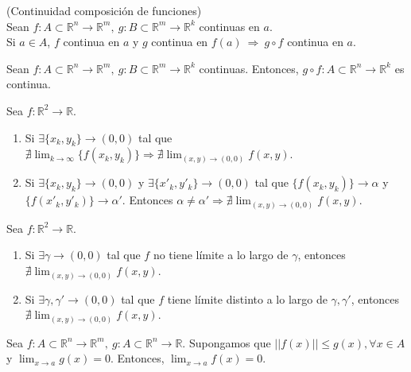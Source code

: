 \begin{prop}(Continuidad composición de funciones)\\
Sean $f:A\subset \mathbb{R}^n \rightarrow \mathbb{R}^m, \ g:B\subset\mathbb{R}^m \rightarrow \mathbb{R}^k$ continuas en $a$. \\ Si $a \in A$, $f$ continua en $a$ y $g$ continua en $f(a) \ \Rightarrow \ g\circ f$ continua en $a$.
\end{prop}

\begin{cor}
Sean $f:A\subset \mathbb{R}^n \rightarrow \mathbb{R}^m, \ g:B\subset\mathbb{R}^m \rightarrow \mathbb{R}^k$ continuas. Entonces, $g\circ f:A\subset \mathbb{R}^n \rightarrow \mathbb{R}^k$ es continua.
\end{cor}

\begin{prop}
Sea $f: \mathbb{R}^2 \rightarrow \mathbb{R}$.
\begin{enumerate}[label=(\roman*)]
    \item Si $\exists \{x_k,y_k\} \rightarrow (0,0)$ tal que  $\nexists \lim_{k\rightarrow \infty} \{f(x_k,y_k)\} \Rightarrow \nexists \lim_{(x,y)\rightarrow(0,0)} f(x,y)$. 
    \item Si $\exists \{x_k,y_k\} \rightarrow (0,0)$ y $\exists \{x'_k,y'_k\} \rightarrow (0,0)$ tal que $\{f(x_k,y_k)\} \rightarrow \alpha$ y $\{f(x'_k,y'_k)\} \rightarrow \alpha'$. Entonces $\alpha \neq \alpha' \Rightarrow \nexists \lim_{(x,y)\rightarrow(0,0)} f(x,y)$.
\end{enumerate}
\end{prop}

\begin{prop}
Sea $f: \mathbb{R}^2 \rightarrow \mathbb{R}$.
\begin{enumerate}[label=(\roman*)]
    \item Si $\exists \gamma \rightarrow (0,0)$ tal que $f$ no tiene límite a lo largo de $\gamma$, entonces $\nexists \lim_{(x,y)\rightarrow(0,0)} f(x,y)$. 
    \item Si $\exists \gamma,\gamma' \rightarrow (0,0)$ tal que $f$ tiene límite distinto a lo largo de $\gamma, \gamma'$, entonces $\nexists \lim_{(x,y)\rightarrow(0,0)} f(x,y)$.
\end{enumerate}
\end{prop}

\begin{theo}
Sea $f:A\subset \mathbb{R}^n \rightarrow \mathbb{R}^m, \ g:A\subset \mathbb{R}^n \rightarrow \mathbb{R}$. Supongamos que $||f(x)|| \leq g(x), \forall x\in A$ y $ \lim_{x\rightarrow a} g(x) = 0$.  Entonces, $\lim_{x\rightarrow a} f(x) = 0 $.
\end{theo}

